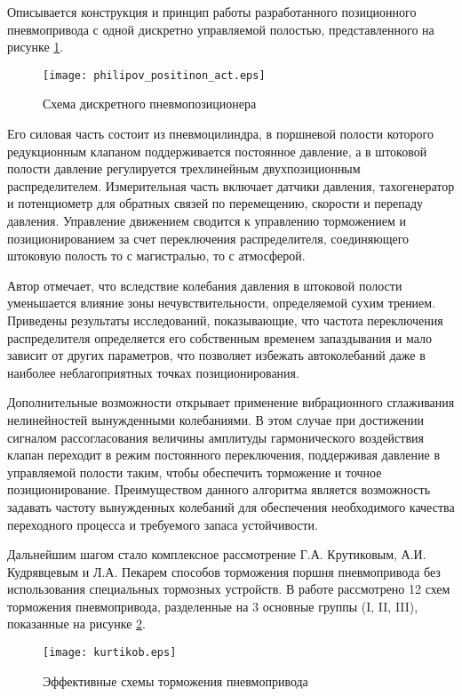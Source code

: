 Описывается конструкция и принцип работы разработанного позиционного пневмопривода с одной дискретно управляемой полостью, представленного
на рисунке \cref*{fig:позиционный_пп_филипов}.

\begin{figure}[h]
	\centerfloat
	\texttt{[image: philipov\_positinon\_act.eps]}
	\caption{Схема дискретного пневмопозиционера}\label{fig:позиционный_пп_филипов}
\end{figure}

Его силовая часть состоит из пневмоцилиндра, в поршневой полости которого редукционным клапаном поддерживается
постоянное давление, а в штоковой полости давление регулируется трехлинейным двухпозиционным распределителем. Измерительная
часть включает датчики давления, тахогенератор и потенциометр для обратных связей по перемещению, скорости и перепаду
давления. Управление движением сводится к управлению торможением и позиционированием за счет переключения распределителя,
соединяющего штоковую полость то с магистралью, то с атмосферой.

Автор отмечает, что вследствие колебания давления в штоковой полости уменьшается влияние зоны нечувствительности,
определяемой сухим трением. Приведены результаты исследований, показывающие, что частота переключения распределителя определяется
его собственным временем запаздывания и мало зависит от других параметров, что позволяет избежать автоколебаний даже
в наиболее неблагоприятных точках позиционирования.

Дополнительные возможности открывает применение вибрационного сглаживания нелинейностей вынужденными колебаниями.
В этом случае при достижении сигналом рассогласования величины амплитуды гармонического воздействия клапан переходит
в режим постоянного переключения, поддерживая давление в управляемой полости таким, чтобы обеспечить торможение и точное
позиционирование. Преимуществом данного алгоритма является возможность задавать частоту вынужденных колебаний для
обеспечения необходимого качества переходного процесса и требуемого запаса устойчивости.

Дальнейшим шагом стало комплексное рассмотрение Г.А. Крутиковым, А.И. Кудрявцевым и Л.А. Пекарем \cite*{крутиков:способы_торможения_12}
способов торможения поршня пневмопривода без использования специальных тормозных устройств. В работе
рассмотрено 12 схем торможения пневмопривода, разделенные на 3 основные группы (I, II, III), показанные на рисунке \cref*{fig:эффективные_схемы_торможения_12}.

\begin{figure}[h]
    \centerfloat
    \texttt{[image: kurtikob.eps]}
    \caption{Эффективные схемы торможения пневмопривода}\label{fig:эффективные_схемы_торможения_12}
\end{figure}


